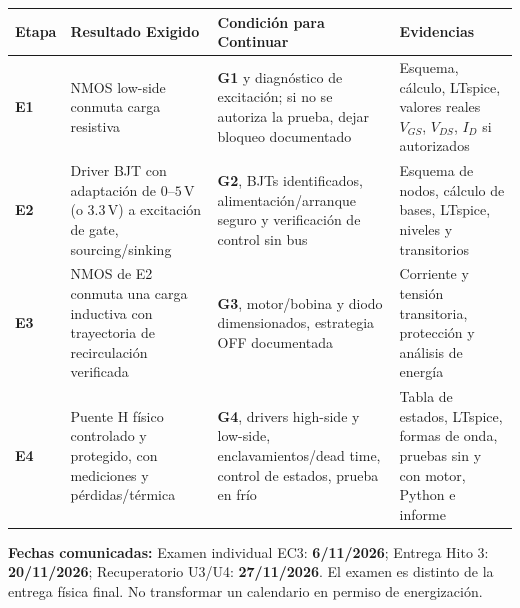 \documentclass[10pt, a4paper, landscape]{article}
\begin{document}
\par\vspace{0.1cm}\noindent
\renewcommand{\arraystretch}{1.28}
\begin{tabularx}{\linewidth}{|p{1.1cm}|>{\raggedright\arraybackslash}p{6.0cm}|>{\raggedright\arraybackslash}X|>{\raggedright\arraybackslash}p{7.4cm}|}
\hline
\rowcolor{ucbgray}
\textbf{Etapa} & \textbf{Resultado Exigido} & \textbf{Condición para Continuar} & \textbf{Evidencias} \\ \hline
\textbf{E1} & NMOS low-side conmuta carga resistiva & \textbf{G1} y diagnóstico de excitación; si no se autoriza la prueba, dejar bloqueo documentado & Esquema, cálculo, LTspice, valores reales $V_{GS}$, $V_{DS}$, $I_D$ si autorizados \\ \hline
\textbf{E2} & Driver BJT con adaptación de $0\text{--}5\,\text{V}$ (o $3.3\,\text{V}$) a excitación de gate, sourcing/sinking & \textbf{G2}, BJTs identificados, alimentación/arranque seguro y verificación de control sin bus & Esquema de nodos, cálculo de bases, LTspice, niveles y transitorios \\ \hline
\textbf{E3} & NMOS de E2 conmuta una carga inductiva con trayectoria de recirculación verificada & \textbf{G3}, motor/bobina y diodo dimensionados, estrategia OFF documentada & Corriente y tensión transitoria, protección y análisis de energía \\ \hline
\textbf{E4} & Puente H físico controlado y protegido, con mediciones y pérdidas/térmica & \textbf{G4}, drivers high-side y low-side, enclavamientos/dead time, control de estados, prueba en frío & Tabla de estados, LTspice, formas de onda, pruebas sin y con motor, Python e informe \\ \hline
\end{tabularx}

\vspace{0.18cm}
\noindent
\textbf{Fechas comunicadas:} Examen individual EC3: \textbf{6/11/2026}; Entrega Hito 3: \textbf{20/11/2026}; Recuperatorio U3/U4: \textbf{27/11/2026}. El examen es distinto de la entrega física final. No transformar un calendario en permiso de energización.
\end{document}
